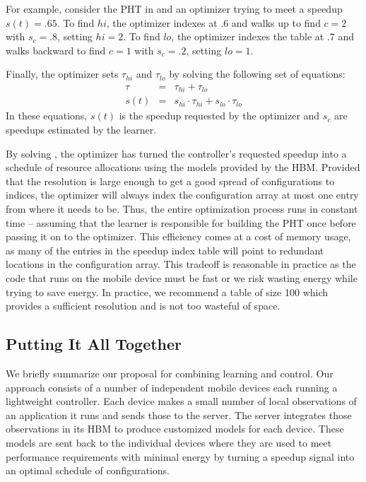 For example, consider the PHT in  and an optimizer trying
to meet a speedup $s(t) = .65$.  To find $hi$, the optimizer indexes
at .6 and walks up to find $c=2$ with $s_c=.8$, setting $hi = 2$.  To
find $lo$, the optimizer indexes the table at .7 and walks backward to
find $c=1$ with $s_c=.2$, setting $lo = 1$.

Finally, the optimizer sets $\tau_{hi}$ and $\tau_{lo}$ by solving the
following set of equations:
\begin{eqnarray}
  \tau &=& \tau_{hi} + \tau_{lo}    \label{eqn:s1} \\
  s(t) &=& s_{hi} \cdot \tau_{hi} + s_{lo} \cdot \tau_{lo} \label{eqn:s2} 
\end{eqnarray}
In these equations, $s(t)$ is the speedup requested by the optimizer
and $s_c$ are speedups estimated by the learner.

By solving , the optimizer has turned the controller's
requested speedup into a schedule of resource allocations using the
models provided by the HBM.  Provided that the resolution is large
enough to get a good spread of configurations to indices, the
optimizer will always index the configuration array at most one entry
from where it needs to be.  Thus, the entire optimization process runs
in constant time -- assuming that the learner is responsible for
building the PHT once before passing it on to the optimizer.  This
efficiency comes at a cost of memory usage, as many of the entries in
the speedup index table will point to redundant locations in the
configuration array.  This tradeoff is reasonable in practice as the
code that runs on the mobile device must be fast or we risk wasting
energy while trying to save energy.  In practice, we recommend a table
of size 100 which provides a sufficient resolution and is not too
wasteful of space.


\subsection{Putting It All Together}
We briefly summarize our proposal for combining learning and control.
Our approach consists of a number of independent mobile devices each
running a lightweight controller.  Each device makes a small number of
local observations of an application it runs and sends those to the
server.  The server integrates those observations in its HBM to
produce customized models for each device.  These models are sent back
to the individual devices where they are used to meet performance
requirements with minimal energy by turning a speedup signal into an
optimal schedule of configurations.








